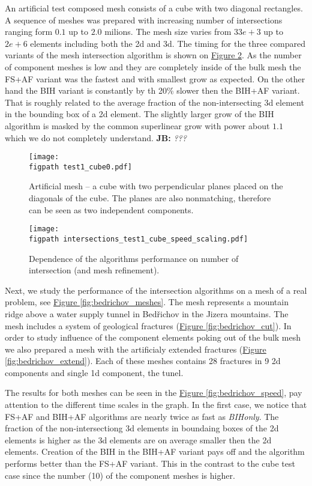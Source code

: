 \documentclass{elsarticle}
\newcommand{\fig}[1]{\hyperref[#1]{Figure \ref{#1}}}
\newcommand{\figpath}{figures/}
\newcommand{\noteJB}[1]{{\color{Blue} \textbf{JB: } \textit{#1}}}
\begin{document}
An artificial test composed mesh consists of a cube with two diagonal rectangles. A sequence of meshes was prepared with increasing number of intersections ranging
form $0.1$ up to $2.0$ milions. The mesh size varies from $33e+3$ up to $2e+6$ elements including both the 2d and 3d. The timing for the three compared variants
of the mesh intersection algorithm is shown on \fig{fig:cube_speed}. As the number of component meshes is low and they are completely 
inside of the bulk mesh the FS+AF variant was the fastest and with smallest grow as expected. On the other hand the BIH variant is constantly by th 20\%
slower then the BIH+AF variant. That is roughly related to the average fraction of the non-intersecting 3d element in the bounding box of a 2d element.
The slightly larger grow of the BIH algorithm is masked by the common superlinear grow with power about $1.1$ which we do not completely understand.
\noteJB{???}


\begin{figure}[!htb]
    \centering
    \texttt{[image: \\figpath test1\_cube0.pdf]}
    \caption{Artificial mesh -- a cube with two perpendicular planes placed on the diagonals of the cube.
             The planes are also nonmatching, therefore can be seen as two independent components.}
    \label{fig:cube_mesh}
\end{figure}
  
\begin{figure}[!htb]
    \centering
    \texttt{[image: \\figpath intersections\_test1\_cube\_speed\_scaling.pdf]}
    \caption{Dependence of the algorithms performance on number of intersection (and mesh refinement). }
    \label{fig:cube_speed}
\end{figure}



Next, we study the performance of the intersection algorithms on a mesh of a real problem, see \fig{fig:bedrichov_meshes}.
The mesh represents a mountain ridge above a water supply tunnel in Bed{\v r}ichov in the Jizera mountains.
The mesh includes a system of geological fractures (\fig{fig:bedrichov_cut}). In order to study influence of the component elements poking out of
the bulk mesh we also prepared a mesh with the artificialy extended fractures (\fig{fig:bedrichov_extend}). 
Each of these meshes contains 28 fractures in 9 2d components and single 1d component, the tunel.

The results for both meshes can be seen in the \fig{fig:bedrichov_speed}, pay attention to the different time
scales in the graph. In the first case, we notice that FS+AF and BIH+AF algorithms are nearly twice as fast as \emph{BIHonly}.
The fraction of the non-intersectiong 3d elements in boundaing boxes of the 2d elements is higher as the 3d elements are on average smaller then the 2d elements.
Creation of the BIH in the BIH+AF variant pays off and the algorithm performs better than the FS+AF variant.
This in the contrast to the cube test case since the number (10) of the component meshes is higher.
\end{document}
